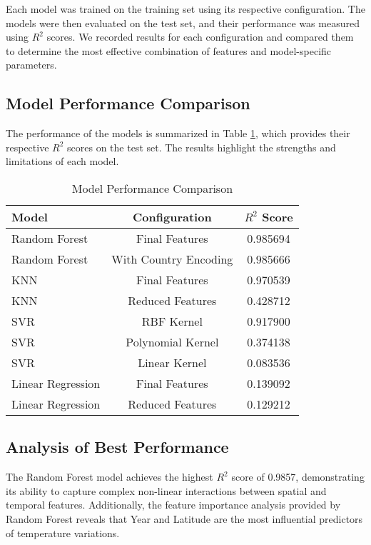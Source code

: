 \documentclass[conference]{IEEEtran}
\begin{document}
Each model was trained on the training set using its respective configuration. The models were then evaluated on the test set, and their performance was measured using \(R^2\) scores. We recorded results for each configuration and compared them to determine the most effective combination of features and model-specific parameters.

\subsection{Model Performance Comparison}
The performance of the models is summarized in Table \ref{tab:model_performance}, which provides their respective \(R^2\) scores on the test set. The results highlight the strengths and limitations of each model.

\begin{table}[htbp]
\centering
\caption{Model Performance Comparison}
\label{tab:model_performance}
\begin{tabular}{|l|c|c|}
\hline
Model & Configuration & \(R^2\) Score \\ \hline
Random Forest & Final Features & 0.985694 \\ \hline
Random Forest & With Country Encoding & 0.985666 \\ \hline
KNN & Final Features & 0.970539 \\ \hline
KNN & Reduced Features & 0.428712 \\ \hline
SVR & RBF Kernel & 0.917900 \\ \hline
SVR & Polynomial Kernel & 0.374138 \\ \hline
SVR & Linear Kernel & 0.083536 \\ \hline
Linear Regression & Final Features & 0.139092 \\ \hline
Linear Regression & Reduced Features & 0.129212 \\ \hline
\end{tabular}
\end{table}


\subsection{Analysis of Best Performance}
The Random Forest model achieves the highest \(R^2\) score of 0.9857, demonstrating its ability to capture complex non-linear interactions between spatial and temporal features. Additionally, the feature importance analysis provided by Random Forest reveals that Year and Latitude are the most influential predictors of temperature variations.
\end{document}

